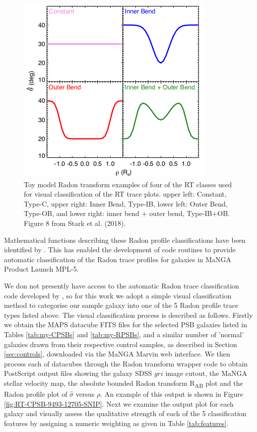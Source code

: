 \begin{figure}
    \centering
    \includegraphics[width=\columnwidth]{images/RadonPlots/Radon-class-models.png}
    \caption{Toy model Radon transform examples of four of the RT classes used for visual classification of the RT trace plots. upper left: Constant, Type-C, upper right: Inner Bend, Type-IB, lower left: Outer Bend, Type-OB, and lower right: inner bend + outer bend, Type-IB+OB. Figure 8 from Stark et al. (2018).}
    \label{fig:class-models}
\end{figure}

Mathematical functions describing these Radon profile classifications have been identified by \citet[][section 3.6]{2018MNRAS.480.2217S}. This has enabled the development of code routines to provide automatic classification of the Radon trace profiles for galaxies in MaNGA Product Launch MPL-5. 

We don not presently have access to the automatic Radon trace classification code developed by \citet[][]{2018MNRAS.480.2217S}, so for this work we adopt a simple visual classification method to categorise our sample galaxy into one of the 5 Radon profile trace types listed above. The visual classification process is described as follows. Firstly we obtain the MAPS datacube FITS files for the selected PSB galaxies listed in Tables \ref{tab:my-CPSBs} and \ref{tab:my-RPSBs}, and a similar number of 'normal' galaxies drawn from their respective control samples, as described in Section  \ref{sec:controls}, downloaded via the MaNGA Marvin web interface. We then process each of datacubes through the Radon transform wrapper code to obtain PostScript output files showing the galaxy SDSS $gri$ image cutout, the MaNGA stellar velocity map, the absolute bounded Radon transform R\textsubscript{AB} plot and the Radon profile plot of $\hat{\sigma}$ versus $\rho$. An example of this output is shown in Figure \ref{fig:RT-CPSB-9493-12705-SNIP}. Next we examine the output plot for each galaxy and visually assess the qualitative strength of each of the 5 classification features by assigning a numeric weighting as given in Table \ref{tab:features}.

